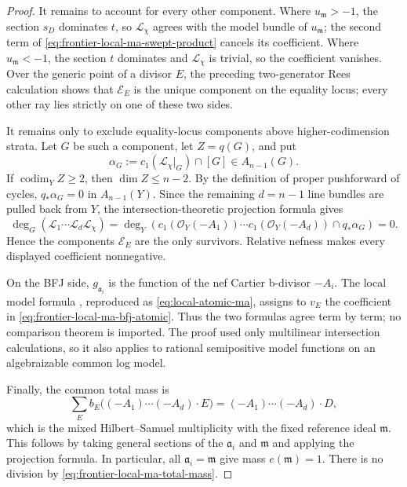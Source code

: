 \begin{proof}
It remains to account for every other component.  Where
\(u_{\mathfrak m}>-1\), the section \(s_D\) dominates \(t\), so
\(\mathcal L_\chi\) agrees with the model bundle of
\(u_{\mathfrak m}\); the second term of
\eqref{eq:frontier-local-ma-swept-product} cancels its coefficient.  Where
\(u_{\mathfrak m}<-1\), the section \(t\) dominates and
\(\mathcal L_\chi\) is trivial, so the coefficient vanishes.  Over the
generic point of a divisor \(E\), the preceding two-generator Rees
calculation shows that \(\mathscr E_E\) is the unique component on the
equality locus; every other ray lies strictly on one of these two sides.

It remains only to exclude equality-locus components above
higher-codimension strata.  Let \(G\) be such a component, let
\(Z=q(G)\), and put
\[
 \alpha_G:=c_1(\mathcal L_\chi|_G)\cap[G]
             \in A_{n-1}(G).
\]
If \(\operatorname{codim}_Y Z\geq2\), then \(\dim Z\leq n-2\).  By the definition of
proper pushforward of cycles, \(q_*\alpha_G=0\) in \(A_{n-1}(Y)\).  Since
the remaining \(d=n-1\) line bundles are pulled back from \(Y\), the
intersection-theoretic projection formula gives
\[
 \deg_G\!\left(\mathcal L_1\cdots\mathcal L_d
                     \mathcal L_\chi\right)
 =\deg_Y\!\left(c_1(\mathcal O_Y(-A_1))\cdots
        c_1(\mathcal O_Y(-A_d))\cap q_*\alpha_G\right)=0.
\]
Hence the components \(\mathscr E_E\) are the only survivors.  Relative
nefness makes every displayed coefficient nonnegative.

On the BFJ side, \(g_{\mathfrak a_i}\) is the function of the nef Cartier
b-divisor \(-A_i\).  The local model formula
\cite[Proposition~4.9]{BFJ08}, reproduced as
\eqref{eq:local-atomic-ma}, assigns to \(v_E\) the coefficient in
\eqref{eq:frontier-local-ma-bfj-atomic}.  Thus the two formulas agree term by
term; no comparison theorem is imported.  The proof used only multilinear
intersection calculations, so it also applies to rational semipositive model
functions on an algebraizable common log model.

Finally, the common total mass is
\begin{equation}
 \sum_Eb_E\bigl((-A_1)\cdots(-A_d)\cdot E\bigr)
 =(-A_1)\cdots(-A_d)\cdot D,
 \label{eq:frontier-local-ma-total-mass}
\end{equation}
which is the mixed Hilbert--Samuel multiplicity with the fixed reference
ideal \(\mathfrak m\).  This follows by taking general sections of the
\(\mathfrak a_i\) and \(\mathfrak m\) and applying the projection formula.
In particular, all \(\mathfrak a_i=\mathfrak m\) give mass
\(e(\mathfrak m)=1\).  There is no division by
\eqref{eq:frontier-local-ma-total-mass}.
\end{proof}

